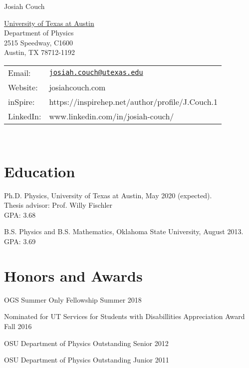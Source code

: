 \documentclass[letterpaper]{article}
\def\name{Josiah Couch}
\renewenvironment{itemize}{
  \begin{list}{}{
    \setlength{\leftmargin}{1.5em}
  }
}{
  \end{list}
}
\begin{document}
{\huge \name}


\vspace{0.25in}

\begin{minipage}{0.45\linewidth}
  \href{}{University of Texas at Austin} \\
  Department of Physics \\
  2515 Speedway, C1600 \\
  Austin, TX 78712-1192
\end{minipage}
\begin{minipage}{0.45\linewidth}
  \begin{tabular}{ll}
    Email: & \href{mailto:josiah.couch@utexas.edu}{\tt josiah.couch@utexas.edu} \\
    Website: & josiahcouch.com \\
    inSpire: & https://inspirehep.net/author/profile/J.Couch.1\\
    LinkedIn: & www.linkedin.com/in/josiah-couch/ 
  \end{tabular}
\end{minipage}
\

\section*{Education}

\begin{itemize}

\item Ph.D. Physics, University of Texas at Austin, \hfill  May 2020 (expected).\\
  Thesis advisor: Prof. Willy Fischler\\
  GPA: 3.68
  
  
  \item B.S. Physics and B.S. Mathematics, Oklahoma State University, \hfill August 2013.\\
  GPA: 3.69

\end{itemize}

\section*{Honors and Awards}
\begin{itemize} \itemsep1pt \parskip0pt 

\item OGS Summer Only Fellowship \hfill{Summer 2018}

\item Nominated for UT Services for Students with Disabillities Appreciation Award \hfill{Fall 2016}

\item OSU Department of Physics Outstanding Senior \hfill{2012}

\item OSU Department of Physics Outstanding Junior \hfill{2011}
\end{itemize}
\end{document}
